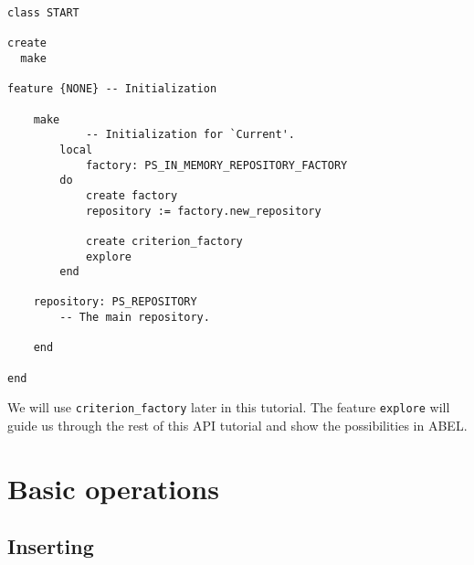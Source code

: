 \documentclass[a4paper,12pt]{report}
\begin{document}


\begin{lstlisting}[language=OOSC2Eiffel, captionpos=b, caption={The START class}, label={lst:tutorial_class}]
class START

create
  make

feature {NONE} -- Initialization

	make
			-- Initialization for `Current'.
		local
			factory: PS_IN_MEMORY_REPOSITORY_FACTORY
		do
			create factory
			repository := factory.new_repository
			
			create criterion_factory
			explore
		end

	repository: PS_REPOSITORY
		-- The main repository.

	end

end
\end{lstlisting}
We will use \lstinline!criterion_factory! later in this tutorial.
The feature \lstinline!explore! will guide us through the rest of this API tutorial and show the possibilities in ABEL.

\chapter{Basic operations}

\section{Inserting}
\end{document}
